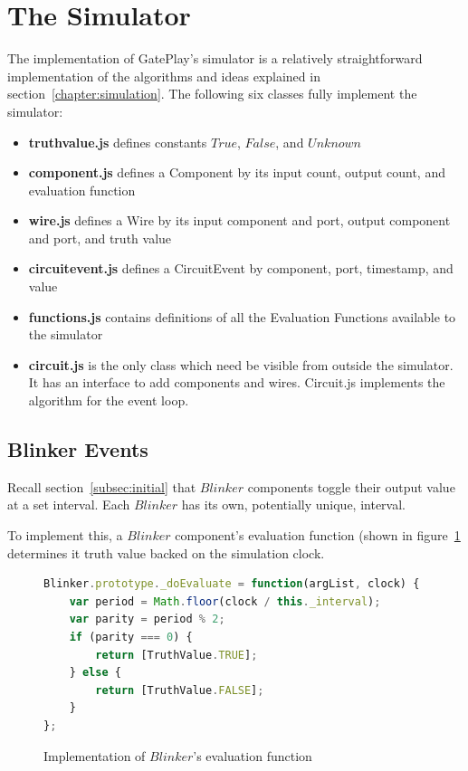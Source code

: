 \section{The Simulator}
\label{section:simulator}
The implementation of GatePlay's simulator is a relatively straightforward implementation of the algorithms and ideas explained in section~\ref{chapter:simulation}. The following six classes fully implement the simulator:

\begin{itemize}
	\item \textbf{truthvalue.js} defines constants $True$, $False$, and $Unknown$
	\item \textbf{component.js} defines a Component by its input count, output count, and evaluation function
	\item \textbf{wire.js} defines a Wire by its input component and port, output component and port, and truth value
	\item \textbf{circuitevent.js} defines a CircuitEvent by component, port, timestamp, and value
	\item \textbf{functions.js} contains definitions of all the Evaluation Functions available to the simulator 
	\item \textbf{circuit.js} is the only class which need be visible from outside the simulator. It has an interface to add components and wires. Circuit.js implements the algorithm for the event loop. 
\end{itemize}

\subsection{Blinker Events}
Recall section~\ref{subsec:initial} that $Blinker$ components toggle their output value at a set interval. Each $Blinker$ has its own, potentially unique, interval.

To implement this, a $Blinker$ component's evaluation function (shown in figure~\ref{fig:blinkereval} determines it truth value backed on the simulation clock.

\begin{figure}
\begin{lstlisting}[language=JavaScript]
Blinker.prototype._doEvaluate = function(argList, clock) {
    var period = Math.floor(clock / this._interval);
    var parity = period % 2;
    if (parity === 0) {
        return [TruthValue.TRUE];
    } else {
        return [TruthValue.FALSE];
    }
};
\end{lstlisting}
\caption{Implementation of $Blinker$'s evaluation function}
\label{fig:blinkereval}
\end{figure}

